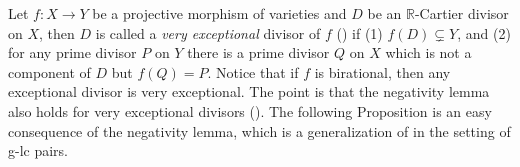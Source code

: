 \documentclass[11pt]{amsart}
\newcommand{\Rr}{\mathbb{R}}
\newcommand{\Qq}{\mathbb{Q}}
\newtheorem{proposition}[theorem]{Proposition}
\begin{document}
\begin{comment}
\begin{proof}
Each claim except (3) and (5) is explicitly stated in \cite{BZ16} Lemma 4.5. (3) holds because we obtain $X'$ by running an MMP/$X$ with scaling and in each step of it, we construct a klt pair. Hence, in each step, the variety itself is klt, and thus for the last step, $(X',0)$ is klt. For (5), when $\lfloor B' \rfloor = 0$, we see that in the construction as \cite[Lemma 4.5]{BZ16}, $\lfloor B \rfloor = 0$, and the g-log discrepancy of any exceptional divisor in the log resolution $\tilde X \to X$ is larger than $0$ (otherwise it would be preserved in $\lfloor B' \rfloor$). By the definition of g-klt singularity, we see that it is independent of the log resolution, hence the original pair $(X, B+M)$ is g-klt. This implies that $(X', B'+M')$ is also g-klt.
\end{proof}



If $X$ has klt singularities, we could extract the divisors which are exactly $S_1, \ldots, S_r$.

\begin{proposition}[{\cite[Lemma 4.6]{BZ16}}]\label{prop: dlt for klt}
Under the notation and assumptions of Proposition \ref{prop: dlt}, further assume that $(X,C)$ is klt for some $C$, and that the generalized log discrepancies of the $S_i$ with respect to $(X, B+ M)$ are $< 1$. Then we can construct $\phi$ so that in addition it satisfies:
\begin{enumerate}
\item its exceptional divisors are exactly $S_1, \ldots, S_r$, and
\item if $r = 1$ and $X$ is $\Qq$-factorial, then $\phi$ is an extremal contraction.
\end{enumerate}
\end{proposition}
\end{comment}

Let $f: X \to Y$ be a projective morphism of varieties and $D$ be an $\Rr$-Cartier divisor on $X$, then $D$ is called a \emph{very exceptional} divisor of $f$ (\cite[Definition 3.2]{Sho03}) if (1) $f(D) \subsetneq Y$, and (2) for any prime divisor $P$ on $Y$ there is a prime divisor $Q$ on $X$ which is not a component of $D$ but $f(Q)=P$. Notice that if $f$ is birational, then any exceptional divisor is very exceptional. The point is that the negativity lemma also holds for very exceptional divisors (\cite[Lemma 3.3]{Birkar12}). The following Proposition is an easy consequence of the negativity lemma, which is a generalization of \cite[Theorem 3.5]{Birkar12} in the setting of g-lc pairs.
\end{document}

